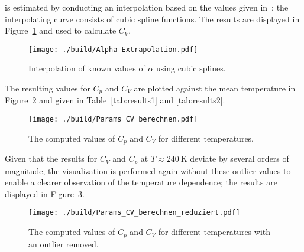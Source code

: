 is estimated by conducting an interpolation based on the values given in~\cite{V47}; the interpolating
curve consists of cubic spline functions. The results are displayed in Figure~\ref{fig:interpol1} and used
to calculate $C_{V}$.
\begin{figure}[H]
	\centering
	\texttt{[image: ./build/Alpha-Extrapolation.pdf]}
	\caption{Interpolation of known values of $\alpha$ using cubic splines.}
	\label{fig:interpol1}
\end{figure}
\noindent
The resulting values for $C_{p}$ and $C_{V}$ are plotted against the mean temperature in Figure~\ref{fig:results} and given in
Table~\ref{tab:results1} and \ref{tab:results2}.
\begin{figure}[H]
	\centering
	\texttt{[image: ./build/Params\_CV\_berechnen.pdf]}
	\caption{The computed values of $C_{p}$ and $C_{V}$ for different temperatures.}
	\label{fig:results}
\end{figure}
\noindent
Given that the results for $C_{V}$ and $C_{p}$ at $T \approx \SI{240}{\kelvin}$ deviate by several orders of magnitude, the visualization is
performed again without these outlier values to enable a clearer observation of the temperature dependence; the results are displayed in
Figure~\ref{fig:results_redu}.
\begin{figure}[H]
	\centering
	\texttt{[image: ./build/Params\_CV\_berechnen\_reduziert.pdf]}
	\caption{The computed values of $C_{p}$ and $C_{V}$ for different temperatures with an outlier removed.}
	\label{fig:results_redu}
\end{figure}
\noindent

